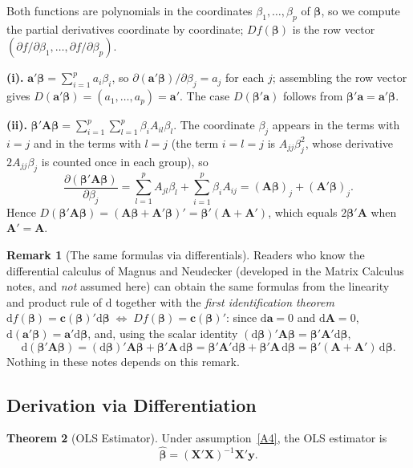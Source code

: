 \documentclass[12pt,a4paper]{article}
\makeatletter
\theoremstyle{definition}
\newtheorem{theorem}{Theorem}[section]
\newtheorem{remark}[theorem]{Remark}
\renewenvironment{proof}[1][\proofname]{\par
  \pushQED{\qed}%
  \normalfont \topsep6\p@\@plus6\p@\relax
  \trivlist
  \item[\hskip\labelsep\bfseries #1\@addpunct{.}]\ignorespaces
}{%
  \popQED\endtrivlist\@endpefalse
}
\newcommand{\dd}{\mathrm{d}}
\newcommand{\ifff}{\;\Longleftrightarrow\;}
\newcommand{\bX}{\mathbf{X}}
\newcommand{\by}{\mathbf{y}}
\def\bb{\boldsymbol{\beta}}
\def\bc{\mathbf{c}}
\newcommand{\bA}{\mathbf{A}}
\newcommand{\ba}{\mathbf{a}}
\makeatother
\begin{document}
\begin{proof}
Both functions are polynomials in the coordinates $\beta_1, \ldots, \beta_p$ of $\bb$, so we compute the partial derivatives coordinate by coordinate; $Df(\bb)$ is the row vector $(\partial f/\partial\beta_1, \ldots, \partial f/\partial\beta_p)$.

\textbf{(i).} $\ba'\bb = \sum_{i=1}^p a_i\beta_i$, so $\partial(\ba'\bb)/\partial\beta_j = a_j$ for each $j$; assembling the row vector gives $D(\ba'\bb) = (a_1, \ldots, a_p) = \ba'$. The case $D(\bb'\ba)$ follows from $\bb'\ba = \ba'\bb$.

\textbf{(ii).} $\bb'\bA\bb = \sum_{i=1}^p\sum_{l=1}^p \beta_i A_{il}\beta_l$. The coordinate $\beta_j$ appears in the terms with $i = j$ and in the terms with $l = j$ (the term $i = l = j$ is $A_{jj}\beta_j^2$, whose derivative $2A_{jj}\beta_j$ is counted once in each group), so
\[
\frac{\partial(\bb'\bA\bb)}{\partial\beta_j} = \sum_{l=1}^p A_{jl}\beta_l + \sum_{i=1}^p \beta_i A_{ij} = (\bA\bb)_j + (\bA'\bb)_j.
\]
Hence $D(\bb'\bA\bb) = (\bA\bb + \bA'\bb)' = \bb'(\bA + \bA')$, which equals $2\bb'\bA$ when $\bA' = \bA$.
\end{proof}

\begin{remark}[The same formulas via differentials]\label{rem:differentials}
Readers who know the differential calculus of Magnus and Neudecker (developed in the Matrix Calculus notes, and \emph{not} assumed here) can obtain the same formulas from the linearity and product rule of $\dd$ together with the \emph{first identification theorem} $\dd f(\bb) = \bc(\bb)'\dd\bb \ifff Df(\bb) = \bc(\bb)'$: since $\dd\ba = 0$ and $\dd\bA = 0$, $\dd(\ba'\bb) = \ba'\dd\bb$, and, using the scalar identity $(\dd\bb)'\bA\bb = \bb'\bA'\dd\bb$,
\[
\dd(\bb'\bA\bb) = (\dd\bb)'\bA\bb + \bb'\bA\,\dd\bb = \bb'\bA'\dd\bb + \bb'\bA\,\dd\bb = \bb'(\bA+\bA')\,\dd\bb.
\]
Nothing in these notes depends on this remark.
\end{remark}

\subsection{Derivation via Differentiation}

\begin{theorem}[OLS Estimator]\label{thm:ols}
Under assumption~\ref{A4}, the OLS estimator is
\begin{equation}
\boxed{\hat{\bb} = (\bX'\bX)^{-1}\bX'\by.}
\end{equation}
\end{theorem}
\end{document}
